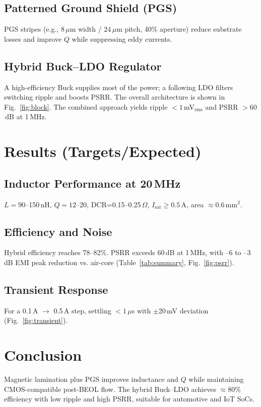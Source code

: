 \documentclass[journal]{IEEEtran}
\begin{document}
\subsection{Patterned Ground Shield (PGS)}
PGS stripes (e.g., $8\,\mu$m width / $24\,\mu$m pitch, 40\% aperture) reduce substrate losses and improve $Q$ while suppressing eddy currents.

\subsection{Hybrid Buck--LDO Regulator}
A high-efficiency Buck supplies most of the power; a following LDO filters switching ripple and boosts PSRR. The overall architecture is shown in Fig.~\ref{fig:block}. The combined approach yields ripple $<1$\,mV$_{\text{rms}}$ and PSRR $>60$\,dB at 1\,MHz.

\section{Results (Targets/Expected)}
\subsection{Inductor Performance at 20\,MHz}
$L=90$--150\,nH, $Q=12$--20, DCR=0.15--0.25\,$\Omega$, $I_{\text{sat}}\geq0.5$\,A, area $\approx0.6$\,mm$^2$.

\subsection{Efficiency and Noise}
Hybrid efficiency reaches 78--82\%. PSRR exceeds 60\,dB at 1\,MHz, with --6 to --3\,dB EMI peak reduction vs. air-core (Table~\ref{tab:summary}, Fig.~\ref{fig:psrr}).

\subsection{Transient Response}
For a 0.1\,A $\rightarrow$ 0.5\,A step, settling $<1\,\mu$s with $\pm$20\,mV deviation (Fig.~\ref{fig:transient}).

\section{Conclusion}
Magnetic lamination plus PGS improves inductance and $Q$ while maintaining CMOS-compatible post-BEOL flow. The hybrid Buck--LDO achieves $\approx$80\% efficiency with low ripple and high PSRR, suitable for automotive and IoT SoCs.
\end{document}
